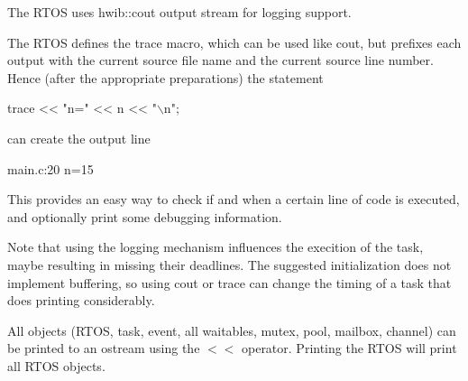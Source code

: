 The R\+T\+OS uses hwib\+::cout output stream for logging support.

The R\+T\+OS defines the trace macro, which can be used like cout, but prefixes each output with the current source file name and the current source line number. Hence (after the appropriate preparations) the statement


\begin{DoxyCode}
trace << \textcolor{stringliteral}{"n="} << n << \textcolor{stringliteral}{"\(\backslash\)n"};
\end{DoxyCode}


can create the output line


\begin{DoxyCode}
main.c:20 n=15
\end{DoxyCode}


This provides an easy way to check if and when a certain line of code is executed, and optionally print some debugging information.

Note that using the logging mechanism influences the execition of the task, maybe resulting in missing their deadlines. The suggested initialization does not implement buffering, so using cout or trace can change the timing of a task that does printing considerably.

All objects (R\+T\+OS, task, event, all waitables, mutex, pool, mailbox, channel) can be printed to an ostream using the $<$$<$ operator. Printing the R\+T\+OS will print all R\+T\+OS objects. 